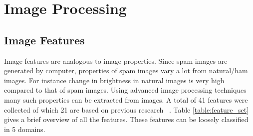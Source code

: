 \chapter{Image Processing}

\section{Image Features}
\par Image features are analogous to image properties. Since spam images are generated by computer, properties of spam images vary a lot from natural/ham images. For instance change in brightness in natural images is very high compared to that of spam images. Using advanced image processing techniques many such properties can be extracted from images.  A total of 41 features were collected  of which 21 are based on previous research ~\cite{6}. Table \ref{table:feature_set} gives a brief overview of all the features. These features can be loosely classified in 5 domains. 

